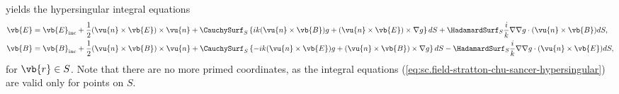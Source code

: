 \documentclass[11pt,SymmetricalJury]{inrsthesis/inrsthesis}
\begin{document}
yields the hypersingular integral equations
  \begin{subequations}
  \label{eq:sc.field-stratton-chu-sancer-hypersingular}
  \begin{align}
  \label{eq:sc.efield-stratton-chu-sancer-hypersingular}
  \vb{E} &= \vb{E}_\text{inc}+ \frac{1}{2}(\vu{n}\times\vb{E})\times\vu{n}
          +\CauchySurf_S
            \left\{ ik(\vu{n}\times \vb{B})              g
                    +   (\vu{n}\times \vb{E})\times \nabla g\right\}dS
          +\HadamardSurf_S\frac{i}{k}\nabla\nabla g\cdot(\vu{n}\times\vb{B}) dS,\\
  \label{eq:sc.bfield-stratton-chu-sancer-hypersingular}
  \vb{B}
      &= \vb{B}_\text{inc} + \frac{1}{2}(\vu{n}\times\vb{B})\times\vu{n}
      +\CauchySurf_S
        \left\{-ik(\vu{n}\times \vb{E})g +(\vu{n}\times \vb{B})\times \nabla g\right\}dS
      -\HadamardSurf_S\frac{i}{k}\nabla\nabla g\cdot(\vu{n}\times\vb{E})dS,
  \end{align}
  \end{subequations}
for $\vb{r}\in S$. Note that there are no more primed coordinates, as the integral
equations (\ref{eq:sc.field-stratton-chu-sancer-hypersingular})
are valid only for points on $S$.
\end{document}
